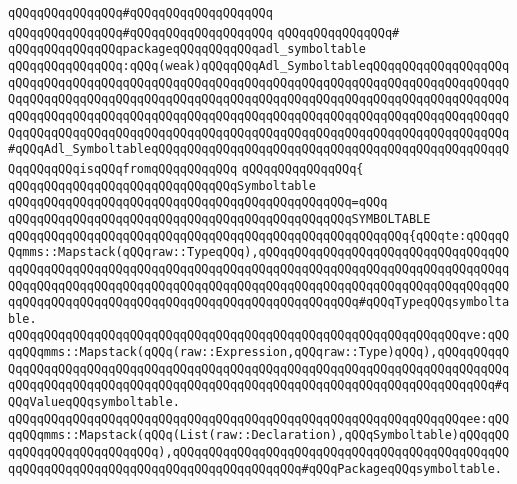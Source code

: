\verb|qQQqqQQqqQQqqQQq#qQQqqQQqqQQqqQQqqQQq|\newline
\verb|qQQqqQQqqQQqqQQq#qQQqqQQqqQQqqQQqqQQq|\newline
\verb|qQQqqQQqqQQqqQQq#|\newline
\verb|qQQqqQQqqQQqqQQqpackageqQQqqQQqqQQqadl_symboltable|\newline
\verb|qQQqqQQqqQQqqQQq:qQQq(weak)qQQqqQQqAdl_SymboltableqQQqqQQqqQQqqQQqqQQqqQQqqQQqqQQqqQQqqQQqqQQqqQQqqQQqqQQqqQQqqQQqqQQqqQQqqQQqqQQqqQQqqQQqqQQqqQQqqQQqqQQqqQQqqQQqqQQqqQQqqQQqqQQqqQQqqQQqqQQqqQQqqQQqqQQqqQQqqQQqqQQqqQQqqQQqqQQqqQQqqQQqqQQqqQQqqQQqqQQqqQQqqQQqqQQqqQQqqQQqqQQqqQQqqQQqqQQqqQQqqQQqqQQqqQQqqQQqqQQqqQQqqQQqqQQqqQQqqQQqqQQqqQQqqQQqqQQqqQQq#qQQqAdl_SymboltableqQQqqQQqqQQqqQQqqQQqqQQqqQQqqQQqqQQqqQQqqQQqqQQqqQQqqQQqqQQqisqQQqfromqQQqqQQqqQQq|\newline
\verb|qQQqqQQqqQQqqQQq{|\newline
\verb|qQQqqQQqqQQqqQQqqQQqqQQqqQQqqQQqSymboltable|\newline
\verb|qQQqqQQqqQQqqQQqqQQqqQQqqQQqqQQqqQQqqQQqqQQqqQQq=qQQq|\newline
\verb|qQQqqQQqqQQqqQQqqQQqqQQqqQQqqQQqqQQqqQQqqQQqqQQqSYMBOLTABLE|\newline
\verb|qQQqqQQqqQQqqQQqqQQqqQQqqQQqqQQqqQQqqQQqqQQqqQQqqQQqqQQq{qQQqte:qQQqqQQqmms::Mapstack(qQQqraw::TypeqQQq),qQQqqQQqqQQqqQQqqQQqqQQqqQQqqQQqqQQqqQQqqQQqqQQqqQQqqQQqqQQqqQQqqQQqqQQqqQQqqQQqqQQqqQQqqQQqqQQqqQQqqQQqqQQqqQQqqQQqqQQqqQQqqQQqqQQqqQQqqQQqqQQqqQQqqQQqqQQqqQQqqQQqqQQqqQQqqQQqqQQqqQQqqQQqqQQqqQQqqQQqqQQqqQQqqQQqqQQqqQQqqQQq#qQQqTypeqQQqsymboltable.|\newline
\verb|qQQqqQQqqQQqqQQqqQQqqQQqqQQqqQQqqQQqqQQqqQQqqQQqqQQqqQQqqQQqqQQqve:qQQqqQQqmms::Mapstack(qQQq(raw::Expression,qQQqraw::Type)qQQq),qQQqqQQqqQQqqQQqqQQqqQQqqQQqqQQqqQQqqQQqqQQqqQQqqQQqqQQqqQQqqQQqqQQqqQQqqQQqqQQqqQQqqQQqqQQqqQQqqQQqqQQqqQQqqQQqqQQqqQQqqQQqqQQqqQQqqQQqqQQqqQQqqQQq#qQQqValueqQQqsymboltable.|\newline
\verb|qQQqqQQqqQQqqQQqqQQqqQQqqQQqqQQqqQQqqQQqqQQqqQQqqQQqqQQqqQQqqQQqee:qQQqqQQqmms::Mapstack(qQQq(List(raw::Declaration),qQQqSymboltable)qQQqqQQqqQQqqQQqqQQqqQQqqQQq),qQQqqQQqqQQqqQQqqQQqqQQqqQQqqQQqqQQqqQQqqQQqqQQqqQQqqQQqqQQqqQQqqQQqqQQqqQQqqQQqqQQqqQQq#qQQqPackageqQQqsymboltable.|\newline
